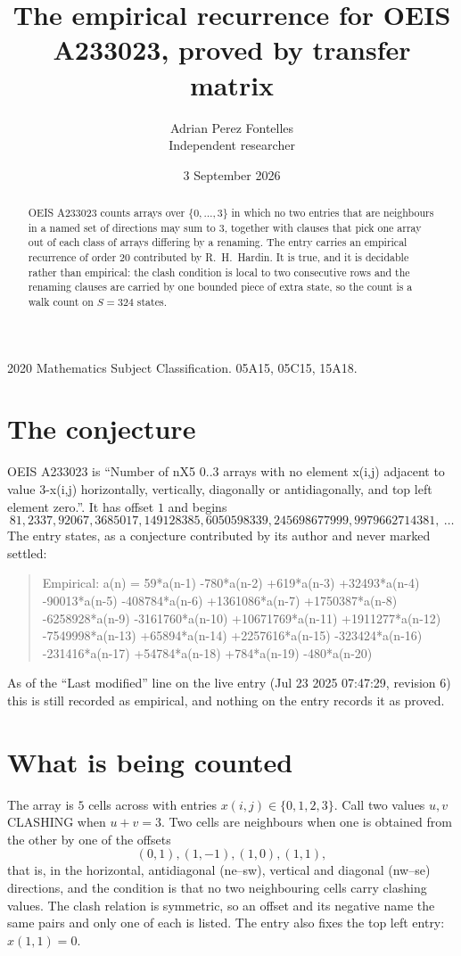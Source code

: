 \documentclass[11pt,a4paper]{article}
\title{The empirical recurrence for OEIS A233023, proved by transfer matrix}
\author{Adrian Perez Fontelles\\ \small Independent researcher}
\date{3 September 2026}
\theoremstyle{plain}
\theoremstyle{definition}
\begin{document}
\maketitle

\begin{abstract}
OEIS A233023 counts arrays over $\{0,\dots,3\}$ in which no two entries that are neighbours in
a named set of directions may sum to $3$, together with clauses that pick one array out of
each class of arrays differing by a renaming. The entry carries an empirical recurrence of
order $20$ contributed by R.~H.~Hardin. It is true, and it is decidable rather than
empirical: the clash condition is local to two consecutive rows and the renaming clauses are
carried by one bounded piece of extra state, so the count is a walk count on $S=324$ states.
\end{abstract}

\noindent\small 2020 Mathematics Subject Classification. 05A15, 05C15, 15A18.\normalsize

\section{The conjecture}

OEIS A233023 is ``Number of nX5 0..3 arrays with no element x(i,j) adjacent to value 3-x(i,j) horizontally, vertically, diagonally or antidiagonally, and top left element zero.''. It has offset $1$ and begins
\[
81, 2337, 92067, 3685017, 149128385, 6050598339, 245698677999, 9979662714381,\ \dots
\]
The entry states, as a conjecture contributed by its author and never marked settled:
\begin{quote}
Empirical: a(n) = 59*a(n-1) -780*a(n-2) +619*a(n-3) +32493*a(n-4) -90013*a(n-5) -408784*a(n-6) +1361086*a(n-7) +1750387*a(n-8) -6258928*a(n-9) -3161760*a(n-10) +10671769*a(n-11) +1911277*a(n-12) -7549998*a(n-13) +65894*a(n-14) +2257616*a(n-15) -323424*a(n-16) -231416*a(n-17) +54784*a(n-18) +784*a(n-19) -480*a(n-20)
\end{quote}
As of the ``Last modified'' line on the live entry (Jul 23 2025 07:47:29, revision 6) this is still
recorded as empirical, and nothing on the entry records it as proved.

\section{What is being counted}

The array is $5$ cells across with entries $x(i,j)\in\{0,1,2,3\}$. Call two values $u,v$ CLASHING
when $u+v=3$. Two cells are neighbours when one is obtained from the other by one of
the offsets
\[
(0,1), (1,-1), (1,0), (1,1),
\]
that is, in the horizontal, antidiagonal (ne--sw), vertical and diagonal (nw--se) directions, and the condition is that no two neighbouring cells carry
clashing values. The clash relation is symmetric, so an offset and its negative name the
same pairs and only one of each is listed. The entry also fixes the top left entry: $x(1,1)=0$.
\end{document}
